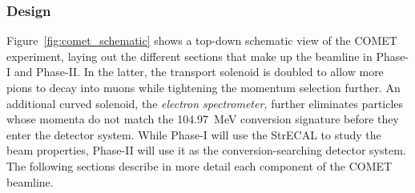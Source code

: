 \subsubsection{Design}
Figure~\ref{fig:comet_schematic} shows a top-down schematic view of the COMET
experiment, laying out the different sections that make up the beamline in
Phase-I and Phase-II. In the latter, the transport solenoid is doubled to allow
more pions to decay into muons while tightening the momentum selection further.
An additional curved solenoid, the \emph{electron spectrometer,} further
eliminates particles whose momenta do not match the \SI{104.97}{\MeV} conversion
signature before they enter the detector system. While Phase-I will use the
StrECAL to study the beam properties, Phase-II will use it as the
conversion-searching detector system.\\
The following sections describe in more detail each component of the COMET
beamline.

